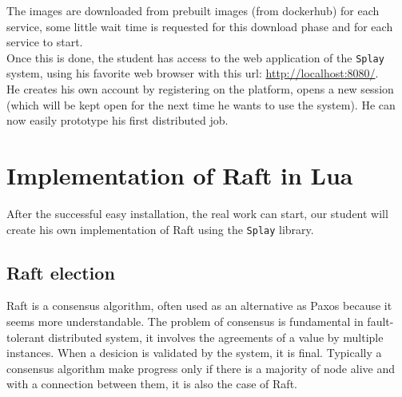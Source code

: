 \documentclass{eplmastersthesis}
\begin{document}
      The images are downloaded from prebuilt images (from dockerhub) for
      each service, some little wait time is requested for this download
      phase and for each service to start.\\
      Once this is done, the student has access to the web application of
      the \texttt{Splay} system, using his favorite web browser with this url:
      \url{http://localhost:8080/}.\\
      He creates his own account by registering on the platform, opens a new
      session (which will be kept open for the next time he wants to use
      the system). He can now easily prototype his first distributed job.

    \section{Implementation of Raft in Lua}

      After the successful easy installation, the real work can start, our
      student will create his own implementation of Raft using the \texttt{Splay}
      library.

      \subsection{Raft election}

        Raft is a consensus algorithm, often used as an alternative as Paxos because
        it seems more understandable. The problem of consensus is fundamental
        in fault-tolerant distributed system, it involves the agreements of
        a value by multiple instances. When a desicion is validated by the system,
        it is final. Typically a consensus algorithm make progress only if there is
        a majority of node alive and with a connection between them, it is
        also the case of Raft. \\
\end{document}
